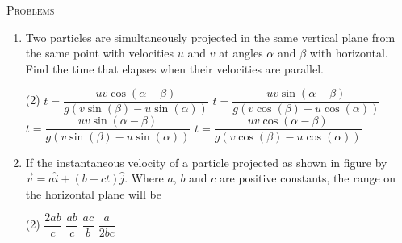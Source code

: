 \documentclass{article}
\renewcommand{\ans}{\quad}
\begin{document}
\begin{center}
    \textsc{Problems}
\end{center}
\begin{enumerate}
    \item Two particles are simultaneously projected in the same vertical plane from the same point with velocities $u$ and $v$ at angles $\alpha$ and $\beta$ with horizontal. Find the time that elapses when their velocities are parallel.	
	\begin{center}
	\end{center}
	\begin{tasks}(2)
		\task $t=\dfrac{uv\cos(\alpha-\beta)}{g(v\sin(\beta)-u\sin(\alpha))}$
		\task $t=\dfrac{uv\sin(\alpha-\beta)}{g(v\cos(\beta)-u\cos(\alpha))}$\ans
		\task $t=\dfrac{uv\sin(\alpha-\beta)}{g(v\sin(\beta)-u\sin(\alpha))}$
		\task $t=\dfrac{uv\cos(\alpha-\beta)}{g(v\cos(\beta)-u\cos(\alpha))}$
	\end{tasks}

    \item If the instantaneous velocity of a particle projected as shown in figure by $\Vec{v}=a\hat{i}+(b-ct)\hat{j}$. Where $a$, $b$ and $c$ are positive constants, the range on the horizontal plane will be
    \begin{center}
    \end{center}
    \begin{tasks}(2)
        \task $\dfrac{2ab}{c}$\ans
        \task $\dfrac{ab}{c}$
        \task $\dfrac{ac}{b}$
        \task $\dfrac{a}{2bc}$
    \end{tasks}


\end{enumerate}
\end{document}
